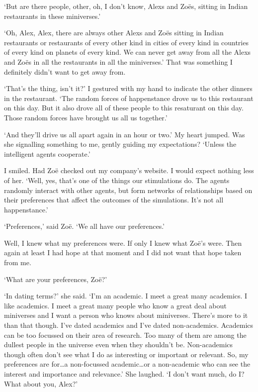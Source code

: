 `But are there people, other, oh, I don't know, Alexs and Zoës,
sitting in Indian restaurants in these miniverses.'

`Oh, Alex, Alex, there are always other Alexs and Zoës sitting
in Indian restaurants or restaurants of every other kind in cities
of every kind in countries of every kind on planets of every kind.
We can never get away from all the Alexs and Zoës in all the
restaurants in all the miniverses.' That was something I definitely
didn't want to get away from.

`That's the thing, isn't it?' I gestured with my hand to indicate
the other dinners in the restaurant. `The random forces of
happenstance drove {\twelveit us\/} to {\twelveit this\/} restaurant
on {\twelveit this\/} day. But it also drove all of {\twelveit
these\/} people to this resaturant on this day. Those random forces
have brought us all us together.'

`And they'll drive us all apart again in an hour or two.' My heart
jumped. Was she signalling something to me, gently guiding my
expectations? `Unless the intelligent agents cooperate.'

I smiled. Had Zoë checked out my company's website. I would
expect nothing less of her. `Well, yes, that's one of the things our
stimulations do. The agents randomly interact with other agents, but
form networks of relationships based on their preferences that
affect the outcomes of the simulations. It's not all happenstance.'

`Preferences,' said Zoë. `We all have our preferences.'

Well, I knew what my preferences were. If only I knew what Zoë's
were. Then again at least I had hope at that moment and I did not
want that hope taken from me.

`What are your preferences, Zoë?'

`In dating terms?' she said. `I'm an academic. I meet a great many
academics. I like academics. I meet a great many people who know a
great deal about miniverses and I want a person who knows about
miniverses. There's more to it than that though. I've dated
academics and I've dated non-academics. Academics can be too
focussed on their area of research. Too many of them are among the
dullest people in the universe even when they shouldn't be. Non-academics though often don't see
what I do as interesting or important or relevant. So, my
preferences are for\dots a non-focussed academic\dots or a non-academic
who can see the interest and importance and relevance.' She laughed.
`I don't want much, do I? What about you, Alex?'

